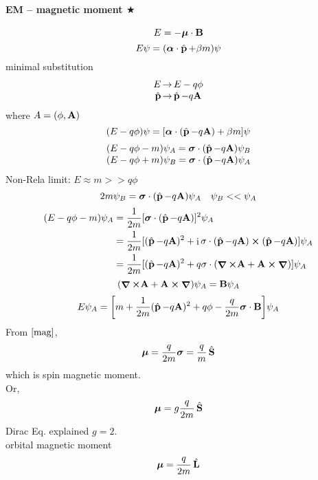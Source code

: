 \documentclass[a4paper]{article}
\DeclareMathOperator{\I}{\mathrm{i}}
\DeclareMathOperator{\ra}{\rightarrow}
\DeclareMathOperator{\na}{\bm{\nabla}}
\DeclareMathOperator{\hL}{\hat{\vb{L}}}
\DeclareMathOperator{\hp}{\hat{\vb{p}}}
\DeclareMathOperator{\hS}{\hat{\vb{S}}}
\numberwithin{equation}{section}
\begin{document}
\paragraph{EM -- magnetic moment $ \bigstar $}
\begin{equation}\label{mag}
E = -\bm\mu\cdot \vb{B}
\end{equation}
\begin{equation}\label{key}
E\psi = (\bm\alpha\cdot\hp + \beta m)\psi
\end{equation}
minimal substitution
\begin{equation}\label{key}
\mqty{E \ra E - q\phi\\
      \hp \ra \hp - q \vb{A}}
\end{equation}
where $ A = (\phi, \vb{A}) $
\begin{equation}\label{key}
(E - q\phi)\psi = [\bm\alpha\cdot(\hp - q \vb{A}) + \beta m]\psi
\end{equation}
\begin{equation}\label{key}
\mqty{(E - q\phi - m)\psi_A = \bm\sigma\cdot(\hp - q\vb{A})\psi_B\\
	  (E - q\phi + m)\psi_B = \bm\sigma\cdot(\hp - q\vb{A})\psi_A}
\end{equation}
Non-Rela limit: $ E \approx m >> q\phi $
\begin{equation}\label{key}
2m\psi_B = \bm\sigma\cdot(\hp - q\vb{A})\psi_A \quad \psi_B << \psi_A
\end{equation}
\begin{equation}\label{key}
\begin{aligned}
(E - q\phi - m)\psi_A &= \dfrac{1}{2m} [\bm\sigma\cdot(\hp - q\vb{A})]^2\psi_A\\
&= \dfrac{1}{2m} [(\hp - q\vb{A})^2 + \I\sigma\cdot(\hp - q\vb{A})\cross(\hp - q\vb{A})]\psi_A\\
&= \dfrac{1}{2m} [(\hp - q\vb{A})^2 + q\sigma\cdot(\na\cross\vb{A} + \vb{A}\cross\na)]\psi_A\\
\end{aligned}
\end{equation}
\begin{equation}\label{key}
(\na\cross\vb{A} + \vb{A}\cross\na)\psi_A = \vb{B}\psi_A
\end{equation}
\begin{equation}\label{key}
E\psi_A = \qty[m + \dfrac{1}{2m}(\hp - q\vb{A})^2 + q\phi - \dfrac{q}{2m}\bm\sigma\cdot\vb{B}]\psi_A
\end{equation}
From $ \eqref{mag} $,
\begin{equation}\label{key}
\bm\mu = \dfrac{q}{2m}\bm\sigma = \dfrac{q}{m}\hS
\end{equation}
which is spin magnetic moment.\\
Or,
\begin{equation}\label{key}
\bm\mu = g\dfrac{q}{2m}\hS
\end{equation}
Dirac Eq. explained $ g=2 $.\\
orbital magnetic moment
\begin{equation}\label{key}
\bm\mu = \dfrac{q}{2m}\hL
\end{equation}
\end{document}
